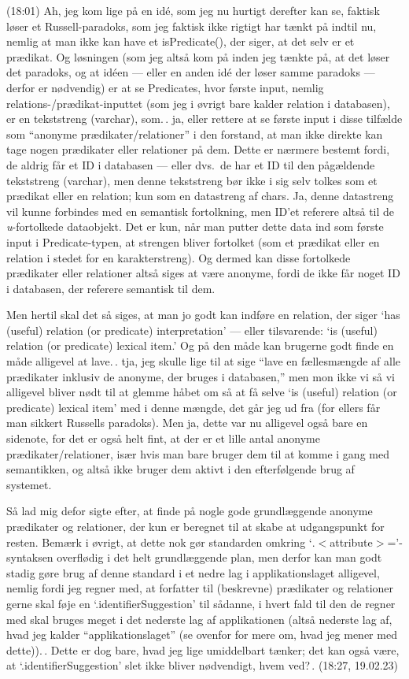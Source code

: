 \documentclass{report}
\begin{document}
(18:01) Ah, jeg kom lige på en idé, som jeg nu hurtigt derefter kan se, faktisk løser et Russell-paradoks, som jeg faktisk ikke rigtigt har tænkt på indtil nu, nemlig at man ikke kan have et isPredicate(), der siger, at det selv er et prædikat. Og løsningen (som jeg altså kom på inden jeg tænkte på, at det løser det paradoks, og at idéen --- eller en anden idé der løser samme paradoks --- derfor er nødvendig) er at se Predicates, hvor første input, nemlig relations-/prædikat-inputtet (som jeg i øvrigt bare kalder relation i databasen), er en tekststreng (varchar), som.\,. ja, eller rettere at se første input i disse tilfælde som ``anonyme prædikater/relationer'' i den forstand, at man ikke direkte kan tage nogen prædikater eller relationer på dem. Dette er nærmere bestemt fordi, de aldrig får et ID i databasen --- eller dvs.\ de har et ID til den pågældende tekststreng (varchar), men denne tekststreng bør ikke i sig selv tolkes som et prædikat eller en relation; kun som en datastreng af chars. Ja, denne datastreng vil kunne forbindes med en semantisk fortolkning, men ID'et referere altså til de \emph{u}-fortolkede dataobjekt. Det er kun, når man putter dette data ind som første input i Predicate-typen, at strengen bliver fortolket (som et prædikat eller en relation i stedet for en karakterstreng). Og dermed kan disse fortolkede prædikater eller relationer altså siges at være anonyme, fordi de ikke får noget ID i databasen, der referere semantisk til dem. 

Men hertil skal det så siges, at man jo godt kan indføre en relation, der siger `has (useful) relation (or predicate) interpretation' --- eller tilsvarende: `is (useful) relation (or predicate) lexical item.' Og på den måde kan brugerne godt finde en måde alligevel at lave.\,. tja, jeg skulle lige til at sige ``lave en fællesmængde af alle prædikater inklusiv de anonyme, der bruges i databasen,'' men mon ikke vi så vi alligevel bliver nødt til at glemme håbet om så at få selve `is (useful) relation (or predicate) lexical item' med i denne mængde, det går jeg ud fra (for ellers får man sikkert Russells paradoks). Men ja, dette var nu alligevel også bare en sidenote, for det er også helt fint, at der er et lille antal anonyme prædikater/relationer, især hvis man bare bruger dem til at komme i gang med semantikken, og altså ikke bruger dem aktivt i den efterfølgende brug af systemet. 

Så lad mig defor sigte efter, at finde på nogle gode grundlæggende anonyme prædikater og relationer, der kun er beregnet til at skabe at udgangspunkt for resten. Bemærk i øvrigt, at dette nok gør standarden omkring `$.<$attribute$>$='-syntaksen overflødig i det helt grundlæggende plan, men derfor kan man godt stadig gøre brug af denne standard i et nedre lag i applikationslaget alligevel, nemlig fordi jeg regner med, at forfatter til (beskrevne) prædikater og relationer gerne skal føje en `.identifierSuggestion' til sådanne, i hvert fald til den de regner med skal bruges meget i det nederste lag af applikationen (altså nederste lag af, hvad jeg kalder ``applikationslaget'' (se ovenfor for mere om, hvad jeg mener med dette)).\,. Dette er dog bare, hvad jeg lige umiddelbart tænker; det kan også være, at `.identifierSuggestion' slet ikke bliver nødvendigt, hvem ved?\,. (18:27, 19.02.23)
\end{document}

